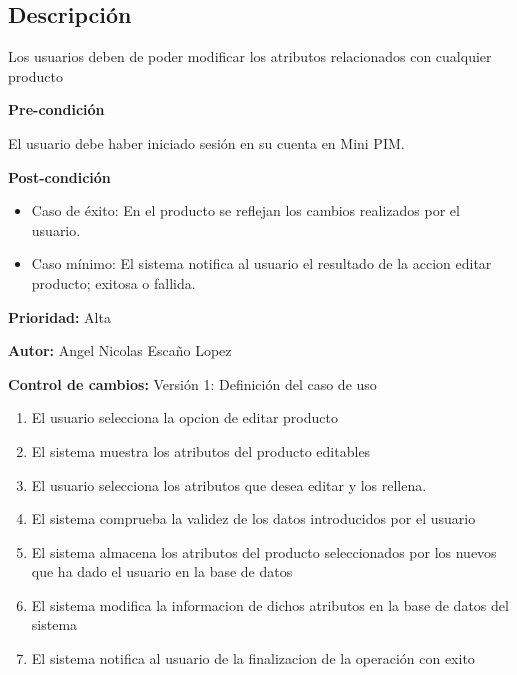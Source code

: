 {}

\subsection*{Descripción}
Los usuarios deben de poder modificar los atributos relacionados con cualquier producto\par
\vspace{0.15cm}

\textbf{Pre-condición}\par
El usuario debe haber iniciado sesión en su cuenta en Mini PIM.\par
\vspace{0.15cm}

\textbf{Post-condición}
\begin{itemize}
    \item Caso de éxito: En el producto se reflejan los cambios realizados por el usuario.
    \item Caso mínimo: El sistema notifica al usuario el resultado de la accion editar producto; exitosa o fallida.
\end{itemize}

\textbf{Prioridad: }
Alta
\vspace{0.15cm}

\textbf{Autor: }
Angel Nicolas Escaño Lopez\par
\vspace{0.15cm}

\textbf{Control de cambios: } Versión 1: Definición del caso de uso

\begin{enumerate}
    \item El usuario selecciona la opcion de editar producto
    \item El sistema muestra los atributos del producto editables
    \item El usuario selecciona los atributos que desea editar y los rellena.
    \item El sistema comprueba la validez de los datos introducidos por el usuario
    \item El sistema almacena los atributos del producto seleccionados por los nuevos que ha dado el usuario en la base de datos
    \item El sistema modifica la informacion de dichos atributos en la base de datos del sistema
    \item El sistema notifica al usuario de la finalizacion de la operación con exito
\end{enumerate}

